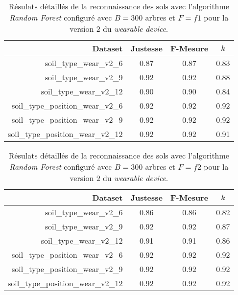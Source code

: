 \begin{table}[H]\renewcommand{\arraystretch}{0.5}
	\centering
	\caption{Résulats détaillés de la reconnaissance des sols avec l'algorithme \textit{Random Forest} configuré avec $B=300$ arbres et $F=f1$ pour la version 2 du \textit{wearable device}.}
	\label{tab:tab:rf-300-f1-wear-v2}
	\begin{tabular}{@{}rccc@{}}
		\toprule
			\textbf{Dataset} & \textbf{Justesse} & \textbf{F-Mesure} & \textbf{$k$} \\
		\midrule
			soil\_type\_wear\_v2\_6 & 0.87 & 0.87 & 0.83 \\
			soil\_type\_wear\_v2\_9 & 0.92 & 0.92 & 0.88 \\
			soil\_type\_wear\_v2\_12 & 0.90 & 0.90 & 0.84 \\
			soil\_type\_position\_wear\_v2\_6 & 0.92 & 0.92 & 0.92 \\
			soil\_type\_position\_wear\_v2\_9 & 0.92 & 0.92 & 0.92 \\
			soil\_type\_position\_wear\_v2\_12 & 0.92 & 0.92 & 0.91 \\
		\bottomrule
	\end{tabular}
\end{table}

\begin{table}[H]\renewcommand{\arraystretch}{0.5}
	\centering
	\caption{Résulats détaillés de la reconnaissance des sols avec l'algorithme \textit{Random Forest} configuré avec $B=300$ arbres et $F=f2$ pour la version 2 du \textit{wearable device}.}
	\label{tab:tab:rf-300-f2-wear-v2}
	\begin{tabular}{@{}rccc@{}}
		\toprule
			\textbf{Dataset} & \textbf{Justesse} & \textbf{F-Mesure} & \textbf{$k$} \\
		\midrule
			soil\_type\_wear\_v2\_6 & 0.86 & 0.86 & 0.82 \\
			soil\_type\_wear\_v2\_9 & 0.92 & 0.92 & 0.87 \\
			soil\_type\_wear\_v2\_12 & 0.91 & 0.91 & 0.86 \\
			soil\_type\_position\_wear\_v2\_6 & 0.92 & 0.92 & 0.92 \\
			soil\_type\_position\_wear\_v2\_9 & 0.92 & 0.92 & 0.92 \\
			soil\_type\_position\_wear\_v2\_12 & 0.92 & 0.92 & 0.92 \\
		\bottomrule
	\end{tabular}
\end{table}

